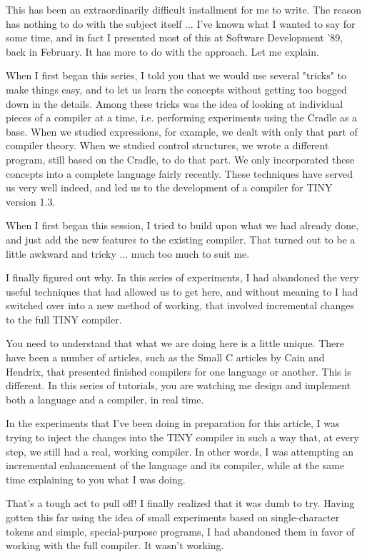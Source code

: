 This has  been an extraordinarily difficult installment for me to write. The reason has nothing to do with the subject  itself ... I've  known  what I wanted to say for some time, and  in  fact  I presented  most  of  this at Software Development  '89, back  in February. It has more to do with the approach. Let me explain.

When I first  began  this  series, I  told you that we would use several "tricks" to  make  things  easy, and to let us learn the concepts without getting too bogged down in the  details. Among these tricks was the idea of looking at individual  pieces  of  a compiler at  a time, i.e. performing experiments using the Cradle as a base. When we studied expressions, for  example, we  dealt with only that part of compiler theory. When we  studied control structures, we wrote a different program, still  based  on  the Cradle, to do that part. We only incorporated these concepts into a complete language fairly recently. These techniques have served us very well indeed, and led us to the development of  a compiler for TINY version 1.3.

When  I  first  began this session, I tried to build upon what we had already done, and  just  add the new features to the existing compiler. That turned out to be a little awkward and  tricky ... much too much to suit me.

I finally figured out why. In this series of experiments, I had abandoned the very useful techniques that had allowed  us  to get here, and  without  meaning  to  I  had  switched over into a new method of  working, that involved incremental changes to the full TINY compiler.

You  need  to  understand that what we are doing here is a little unique. There have been a number of articles, such as  the Small C articles by Cain and Hendrix, that presented finished compilers for one language or another. This is different. In  this series of tutorials, you are  watching  me  design  and implement both a language and a compiler, in real time.

In the experiments that I've been doing in  preparation  for this article, I  was  trying to inject  the  changes  into  the  TINY compiler  in such a way that, at every step, we still had a real, working  compiler. In   other  words, I  was  attempting  an incremental enhancement of the language and  its  compiler, while at the same time explaining to you what I was doing.

That's a tough act to pull off!  I finally  realized  that it was dumb to try. Having  gotten  this  far using the idea of small experiments   based   on   single-character  tokens  and  simple, special-purpose  programs, I  had  abandoned  them  in  favor of working with the full compiler. It wasn't working.

